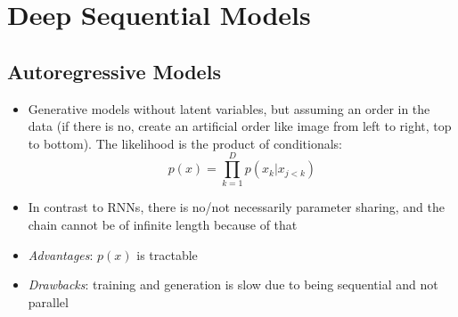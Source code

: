 \section{Deep Sequential Models}
\subsection{Autoregressive Models}
\begin{itemize}
	\item Generative models without latent variables, but assuming an order in the data (if there is no, create an artificial order like image from left to right, top to bottom). The likelihood is the product of conditionals:
	$$p(x)=\prod_{k=1}^{D} p(x_k|x_{j<k})$$
	\item In contrast to RNNs, there is no/not necessarily parameter sharing, and the chain cannot be of infinite length because of that
	\item \textit{Advantages}: $p(x)$ is tractable
	\item \textit{Drawbacks}: training and generation is slow due to being sequential and not parallel
\end{itemize}
